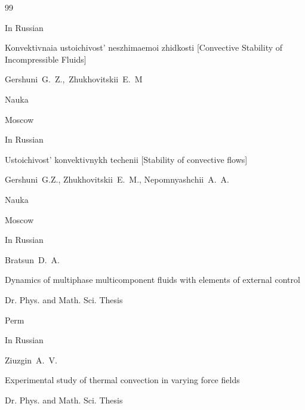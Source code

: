 \begin{thebibliography}{99}






\lang In Russian

\book Konvektivnaia ustoichivost' neszhimaemoi zhidkosti \rm [Convective Stability of Incompressible Fluids]

\by Gershuni~G.~Z.,~Zhukhovitskii~E.~M


\publ Nauka

\publaddr Moscow





\lang In Russian

\book Ustoichivost' konvektivnykh techenii \rm [Stability of convective flows]

\by Gershuni~G.Z., Zhukhovitskii~E.~M., Nepomnyashchii~A.~A.


\publ Nauka

\publaddr Moscow









\lang In Russian


\by Bratsun~D.~A.

\thesis Dynamics of multiphase multicomponent fluids with elements of external control

\thesisinfo Dr. Phys. and Math. Sci. Thesis

\publaddr Perm









\lang In Russian


\by Ziuzgin~A.~V.

\thesis Experimental study of thermal convection in varying force fields

\thesisinfo Dr. Phys. and Math. Sci. Thesis


\end{thebibliography}
